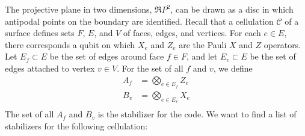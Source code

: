 The projective plane in two dimensions, $\mathfrak{R}P^2$, can be drawn as a disc in which antipodal points on the boundary are identified. Recall that a cellulation $\mathcal{C}$ of a surface defines sets $F$, $E$, and $V$ of faces, edges, and vertices. For each $e \in E$, there corresponds a qubit on which $X_e$ and $Z_e$ are the Pauli $X$ and $Z$ operators. Let $E_f \subset E$ be the set of edges around face $f \in F$, and let $E_v \subset E$ be the set of edges attached to vertex $v \in V$. For the set of all $f$ and $v$, we define
\begin{align}
    A_f &= \bigotimes\limits_{e \in E_f} Z_e \\
    B_v &= \bigotimes\limits_{e \in E_v} X_e \\
\end{align}
The set of all $A_f$ and $B_v$ is the stabilizer for the code. We want to find a list of stabilizers for the following cellulation:

